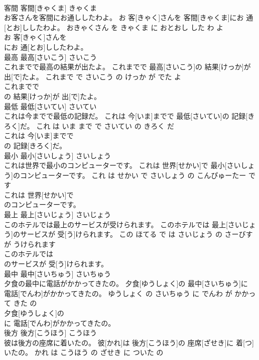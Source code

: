 \documentclass[8pt]{extreport}
\begin{document}
\begin{CJK}{UTF8}{min}
\\	客間	客間[きゃくま]	きゃくま	
\\	お客さんを客間にお通ししたわよ。	お 客[きゃく]さんを 客間[きゃくま]にお 通[とお]ししたわよ。	おきゃくさん を きゃくま に おとおし した わ よ	
\\	お 客[きゃく]さんを
\\	にお 通[とお]ししたわよ。			
\\	最高	最高[さいこう]	さいこう	
\\	これまでで最高の結果が出たよ。	これまでで 最高[さいこう]の 結果[けっか]が 出[で]たよ。	これまで で さいこう の けっか が でた よ	
\\	これまでで
\\	の 結果[けっか]が 出[で]たよ。			
\\	最低	最低[さいてい]	さいてい	
\\	これは今までで最低の記録だ。	これは 今[いま]までで 最低[さいてい]の 記録[きろく]だ。	これ は いま まで で さいてい の きろく だ	
\\	これは 今[いま]までで
\\	の 記録[きろく]だ。			
\\	最小	最小[さいしょう]	さいしょう	
\\	これは世界で最小のコンピューターです。	これは 世界[せかい]で 最小[さいしょう]のコンピューターです。	これ は せかい で さいしょう の こんぴゅーたー です	
\\	これは 世界[せかい]で
\\	のコンピューターです。			
\\	最上	最上[さいじょう]	さいじょう	
\\	このホテルでは最上のサービスが受けられます。	このホテルでは 最上[さいじょう]のサービスが 受[う]けられます。	この ほてる で は さいじょう の さーびす が うけられます	
\\	このホテルでは
\\	のサービスが 受[う]けられます。			
\\	最中	最中[さいちゅう]	さいちゅう	
\\	夕食の最中に電話がかかってきたの。	夕食[ゆうしょく]の 最中[さいちゅう]に 電話[でんわ]がかかってきたの。	ゆうしょく の さいちゅう に でんわ が かかって きた の	
\\	夕食[ゆうしょく]の
\\	に 電話[でんわ]がかかってきたの。			
\\	後方	後方[こうほう]	こうほう	
\\	彼は後方の座席に着いたの。	彼[かれ]は 後方[こうほう]の 座席[ざせき]に 着[つ]いたの。	かれ は こうほう の ざせき に ついた の	

\end{CJK}
\end{document}
